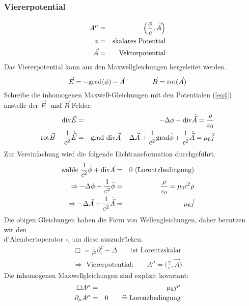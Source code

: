 \subsubsection{Viererpotential}
\begin{eqnarray*} A^{\mu}  &=& \Big ( \frac{\phi}c,\vec A \Big )\\
\phi &=& \text{skalares Potential}\\
\vec A &=& \text{Vektorpotential}\\
\end{eqnarray*}
Das Viererpotential kann aus den Maxwellgleichungen hergeleitet werden.\\
\begin{equation}\label{eq4}
\vec E = - \text{grad} (\phi) - \dot{\vec A} \qquad \qquad \vec B = \text{rot}( \vec A)
\end{equation}
Schreibe die inhomogenen Maxwell-Gleichungen mit den Potentialen (\ref{eq4}) anstelle der $\vec E $- und $\vec B$-Felder.
\begin{eqnarray*}
\text{div} \vec E &=& -\Delta \phi - \text{div}\dot{\vec A} = \frac{\rho}{\varepsilon_0}\\
\text{rot} \vec B - \frac 1 {c^2} \dot{\vec E} &=& \text{grad} \ \text{div} \vec A - \Delta \vec A + \frac 1 {c^2} \text{grad} \dot \phi + \frac 1 {c^2} \ddot{\vec A } = \mu_0 \vec j
\end{eqnarray*}
Zur Vereinfachung wird die folgende Eichtransformation durchgeführt.
\begin{eqnarray*} \text{wähle }\frac 1 {c^2 } \dot \phi + \text{div} \vec A &=& 0 \text{  (Lorentzbedingung)}\\
\Rightarrow -\Delta \phi + \frac 1 {c^2} \ddot \phi &=& \frac{\rho}{\varepsilon_0} = \mu_0 c^2 \rho\\
\Rightarrow -\Delta \vec A + \frac 1 {c^2} \ddot{\vec A} &=& \mu_0 \vec j
\end{eqnarray*}
Die obigen Gleichungen haben die Form von Wellengleichungen, daher benutzen wir den \\ d'Alembertoperator $\square$, um diese auszudrücken. 
\begin{eqnarray*}
\Box  = \frac 1 {c^2} \partial_t^2 - \Delta \quad \quad \text{ist Lorentzskalar}\\
\Longrightarrow \text{  Viererpotential:}\qquad A^{\mu} = \Big ( \frac{\phi}c , \vec A \Big )
\end{eqnarray*}
Die inhomogenen Maxwellgleichungen sind  explizit kovariant:
\begin{eqnarray*}
\Box A^{\mu} &=& \mu_0 j^{\mu}\\
\partial_{\mu} A^{\mu} &=& 0 \qquad \widehat = \text{  Lorenzbedingung}
\end{eqnarray*}



